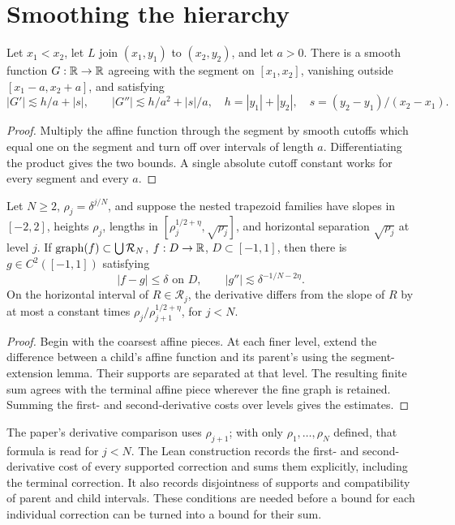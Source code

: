 \section{Smoothing the hierarchy}

\begin{lemma}
\label{lem:segment-extension}
\leanok
Let $x_1<x_2$, let $L$ join $(x_1,y_1)$ to $(x_2,y_2)$, and let
$a>0$. There is a smooth function $G:\mathbb{R}\to\mathbb{R}$ agreeing with the
segment on $[x_1,x_2]$, vanishing outside
$[x_1-a,x_2+a]$, and satisfying
\[
 |G'|\lesssim h/a+|s|,\qquad
 |G''|\lesssim h/a^2+|s|/a,
 \quad h=|y_1|+|y_2|,\quad s=(y_2-y_1)/(x_2-x_1).
\]
\end{lemma}
\begin{proof}
\leanok
Multiply the affine function through the segment by smooth cutoffs
which equal one on the segment and turn off over intervals of length
$a$. Differentiating the product gives the two bounds. A single
absolute cutoff constant works for every segment and every $a$.
\end{proof}

\begin{proposition}
\label{prop:trapezoid-smoothing}
Let $N\geq2$, $\rho_j=\delta^{j/N}$, and suppose the nested
trapezoid families have slopes in $[-2,2]$, heights $\rho_j$,
lengths in $[\rho_j^{1/2+\eta},\sqrt{\rho_j}]$, and horizontal
separation $\sqrt{\rho_j}$ at level $j$. If
$\operatorname{graph}(f)\subset\bigcup\mathcal R_N$, $f:D\to\mathbb{R}$,
$D\subset[-1,1]$, then there is $g\in C^2([-1,1])$ satisfying
\[
 |f-g|\leq\delta\text{ on }D,
 \qquad |g''|\lesssim\delta^{-1/N-2\eta}.
\]
On the horizontal interval of $R\in\mathcal R_j$, the derivative
differs from the slope of $R$ by at most a constant times
$\rho_j/\rho_{j+1}^{1/2+\eta}$, for $j<N$.
\end{proposition}
\begin{proof}
Begin with the coarsest affine pieces. At each finer level, extend
the difference between a child's affine function and its parent's
using the segment-extension lemma. Their supports are separated at
that level. The resulting finite sum agrees with the terminal affine
piece wherever the fine graph is retained. Summing the first- and
second-derivative costs over levels gives the estimates.
\end{proof}

\begin{remark}
\label{rem:smoothing}
The paper's derivative comparison uses $\rho_{j+1}$; with only
$\rho_1,\ldots,\rho_N$ defined, that formula is read for $j<N$.
The Lean construction records the first- and second-derivative cost
of every supported correction and sums them explicitly, including
the terminal correction. It also records disjointness of supports
and compatibility of parent and child intervals. These conditions
are needed before a bound for each individual correction can be
turned into a bound for their sum.
\end{remark}
